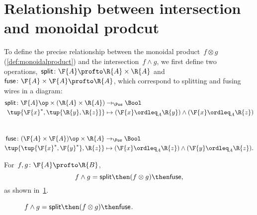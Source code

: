 \section{Relationship between intersection and monoidal prodcut}
To define the precise relationship between the monoidal product~$f \otimes g$ (\cref{def:monoidalproduct}) and the intersection~$f \wedge g$, we first define two operations,~$\mathsf{split} \colon \F{A} \profto \R{A} \times \R{A}$ and~$\mathsf{fuse} \colon \F{A} \times \F{A} \profto \R{A}$, which correspond to splitting and fusing wires in a diagram:
\begin{equation}
    \begin{aligned}
        \mathsf{split} \colon \F{A}\op \times (\R{A} \times \R{A}) & \to_\Pos \Bool \\
        \tup{\F{x}^*, \tup{\R{y}, \R{z}}}                          & \mapsto (\F{x} \ordleq_A \R{y}) \wedge (\F{x} \ordleq_A \R{z})
    \end{aligned}
\end{equation}
~
\begin{equation}
    \begin{aligned}
        \mathsf{fuse} \colon (\F{A} \times \F{A})\op \times \R{A} & \to_\Pos \Bool \\
        \tup{ \tup{\F{x}^*, \F{y}^*}, \R{z}}                      & \mapsto (\F{x} \ordleq_A \R{z}) \wedge (\F{y} \ordleq_A \R{z}).
    \end{aligned}
\end{equation}

\begin{lemma}
    \label{lem:intersection_split}
    For~$f,g \colon \F{A} \profto \R{B}$,
    \begin{equation}
        f \wedge g = \mathsf{split} \then (f \otimes g) \then \mathsf{fuse},
    \end{equation}
    as shown in~\cref{fig:lemmasplitfuse}.
    \begin{figure}[h!]
        \begin{center}
        \end{center}
        \caption{$f \wedge g = \mathsf{split} \then (f \otimes g) \then \mathsf{fuse}$. }
        \label{fig:lemmasplitfuse}
    \end{figure}
\end{lemma}


